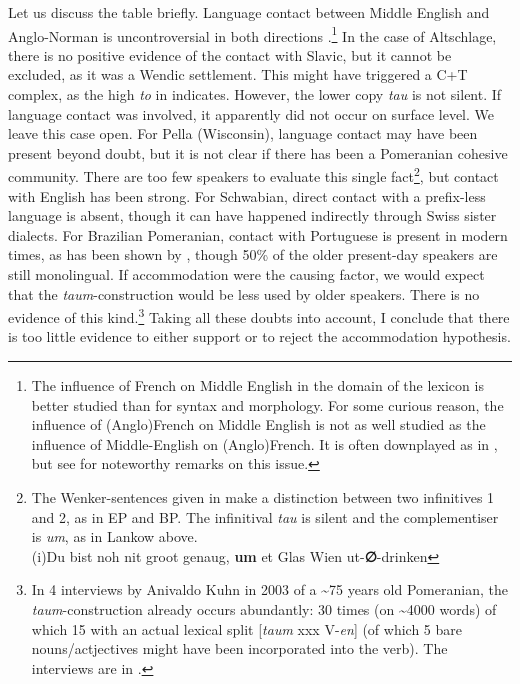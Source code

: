 \documentclass[output=paper,hidelinks,draftmode]{langscibook}
\begin{document}
Let us discuss the table briefly. Language contact between Middle English and Anglo-Norman is uncontroversial in both directions \citep{Mustanoia1960, Dalton1996, Ingham2012, Rothwell2001, Steiner2010}.\footnote{The influence of French on Middle English in the domain of the lexicon is better studied than for syntax and morphology. For some curious reason, the influence of (Anglo)French on Middle English is not as well studied as the influence of Middle-English on (Anglo)French. It is often downplayed as in \citet[306ff]{Thomason1988}, but see \citet{Ingham2009} for noteworthy remarks on this issue.} In the case of Altschlage, there is no positive evidence of the contact with Slavic, but it cannot be excluded, as it was a Wendic settlement. This might have triggered a C+T complex, as the high \textit{to} in  indicates. However, the lower copy \textit{tau} is not silent. If language contact was involved, it apparently did not occur on surface level. We leave this case open. For Pella (Wisconsin), language contact may have been present beyond doubt, but it is not clear if there has been a Pomeranian cohesive community. There are too few speakers to evaluate this single fact\footnote{The Wenker-sentences given in \citet[175]{Louden2009} make a distinction between two infinitives 1 and 2, as in EP and BP. The infinitival \textit{tau} is silent and the complementiser is \textit{um}, as in Lankow  above.\\(i)Du bist noh nit groot genaug, \textbf{um} et Glas Wien ut-\textbf{∅}{}-drinken}, but contact with English has been strong. For Schwabian, direct contact with a prefix-less language is absent, though it can have happened indirectly through Swiss sister dialects. For Brazilian Pomeranian, contact with Portuguese is present in modern times, as has been shown by \citet[177, graph 4]{Schaffel2014}, though 50\% of the older present-day speakers are still monolingual. If accommodation were the causing factor, we would expect that the \textit{taum}{}-construction would be less used by older speakers. There is no evidence of this kind.\footnote{In 4 interviews by Anivaldo Kuhn in 2003 of a {\textasciitilde}75 years old Pomeranian, the \textit{taum}{}-construction already occurs abundantly: 30 times (on {\textasciitilde}4000 words) of which 15 with an actual lexical split [\textit{taum} xxx V-\textit{en}] (of which 5 bare nouns/actjectives might have been incorporated into the verb). The interviews are in \citet[507--556]{Seibel2010}.} Taking all these doubts into account, I conclude that there is too little evidence to either support or to reject the accommodation hypothesis.
\end{document}
